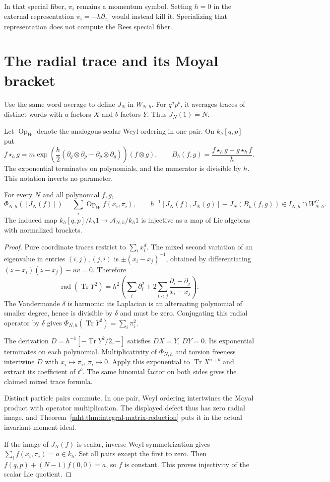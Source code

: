 In that special fiber, $\pi_i$ remains a momentum symbol.
Setting $h=0$ in the external representation
$\pi_i=-h\partial_{x_i}$ would instead kill it. Specializing
that representation does not compute the Rees special fiber.

\section{The radial trace and its Moyal bracket}

Use the same word average to define $J_N$ in $W_{N,h}$.
For $q^ap^b$, it averages traces of distinct words with $a$
factors $X$ and $b$ factors $Y$.
Thus $J_N(1)=N$.

Let $\operatorname{Op}_W$ denote the
analogous scalar Weyl ordering in one pair. On $k_h[q,p]$ put
\[
 f\star_hg=m\exp\!\left(\frac h2
 (\partial_q\otimes\partial_p-\partial_p\otimes\partial_q)\right)
 (f\otimes g),\qquad
 B_h(f,g)=\frac{f\star_hg-g\star_hf}{h}.
\]
The exponential terminates on polynomials, and the numerator
is divisible by $h$. This notation inverts no parameter.

\begin{theorem}\label{mht:thm:radial-trace}
For every $N$ and all polynomial $f,g$,
\[
 \Phi_{N,h}([J_N(f)])
       =\sum_i\operatorname{Op}_Wf(x_i,\pi_i),\qquad
 h^{-1}[J_N(f),J_N(g)]-J_N(B_h(f,g))
       \in I_{N,h}\cap W_{N,h}^G.
\]
The induced map
$k_h[q,p]/k_h1\longrightarrow\mathcal A_{N,h}/k_h1$
is injective as a map of Lie algebras with normalized brackets.
\end{theorem}
\begin{proof}
Pure coordinate traces restrict to $\sum_i x_i^d$.
The mixed second variation of an eigenvalue in entries
$(i,j),(j,i)$ is $\pm(x_i-x_j)^{-1}$, obtained by
differentiating $(z-x_i)(z-x_j)-uv=0$. Therefore
\[
 \operatorname{rad}(\operatorname{Tr}Y^2)
 =h^2\left(\sum_i\partial_i^2+
       2\sum_{i<j}\frac{\partial_i-\partial_j}{x_i-x_j}\right).
\]
The Vandermonde $\delta$ is harmonic: its Laplacian is an
alternating polynomial of smaller degree, hence is divisible
by $\delta$ and must be zero. Conjugating this radial operator
by $\delta$ gives $\Phi_{N,h}(\operatorname{Tr}Y^2)=\sum_i\pi_i^2$.

The derivation $D=h^{-1}[-\operatorname{Tr}Y^2/2,-]$
satisfies $DX=Y$, $DY=0$. Its exponential terminates on each
polynomial. Multiplicativity of $\Phi_{N,h}$ and torsion
freeness intertwine $D$ with $x_i\mapsto\pi_i$, $\pi_i\mapsto0$.
Apply this exponential to $\operatorname{Tr}X^{a+b}$ and
extract its coefficient of $t^b$. The same binomial factor
on both sides gives the claimed mixed trace formula.

Distinct particle pairs commute. In one pair, Weyl ordering
intertwines the Moyal product with operator multiplication.
The displayed defect thus has zero radial image, and
Theorem~\ref{mht:thm:integral-matrix-reduction} puts it in the
actual invariant moment ideal.

If the image of $J_N(f)$ is scalar, inverse Weyl symmetrization
gives $\sum_i f(x_i,\pi_i)=a\in k_h$. Set all pairs except
the first to zero. Then $f(q,p)+(N-1)f(0,0)=a$, so $f$
is constant. This proves injectivity of the scalar Lie quotient.
\end{proof}

